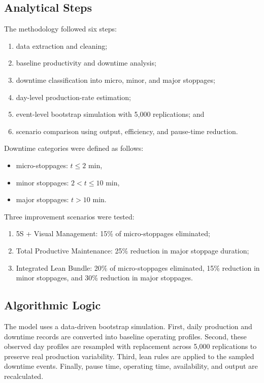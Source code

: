 \documentclass[conference]{IEEEtran}
\begin{document}
\subsection{Analytical Steps}
The methodology followed six steps:
\begin{enumerate}
    \item data extraction and cleaning;
    \item baseline productivity and downtime analysis;
    \item downtime classification into micro, minor, and major stoppages;
    \item day-level production-rate estimation;
    \item event-level bootstrap simulation with 5,000 replications; and
    \item scenario comparison using output, efficiency, and pause-time reduction.
\end{enumerate}

Downtime categories were defined as follows:
\begin{itemize}
    \item micro-stoppages: $t \leq 2$ min,
    \item minor stoppages: $2 < t \leq 10$ min,
    \item major stoppages: $t > 10$ min.
\end{itemize}

Three improvement scenarios were tested:
\begin{enumerate}
    \item 5S + Visual Management: 15\% of micro-stoppages eliminated;
    \item Total Productive Maintenance: 25\% reduction in major stoppage duration;
    \item Integrated Lean Bundle: 20\% of micro-stoppages eliminated, 15\% reduction in minor stoppages, and 30\% reduction in major stoppages.
\end{enumerate}

\subsection{Algorithmic Logic}
The model uses a data-driven bootstrap simulation. First, daily production and downtime records are converted into baseline operating profiles. Second, these observed day profiles are resampled with replacement across 5,000 replications to preserve real production variability. Third, lean rules are applied to the sampled downtime events. Finally, pause time, operating time, availability, and output are recalculated.
\end{document}
